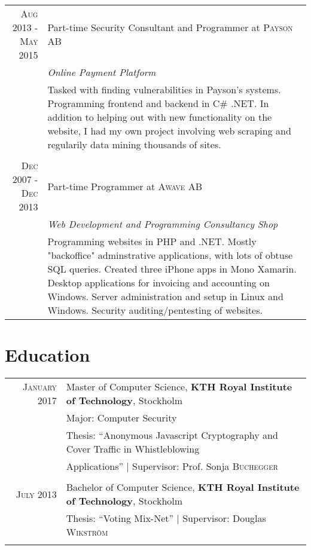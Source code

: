 \documentclass[a4paper,10pt]{article}
\begin{document}
\begin{tabular}{r|p{11cm}}
\textsc{Aug 2013 - May 2015} & Part-time Security Consultant and Programmer at \textsc{Payson AB}\\
&\emph{Online Payment Platform}
\\&\footnotesize{Tasked with finding vulnerabilities in Payson's systems. 
Programming frontend and backend in C\# .NET. In addition to helping out with new 
functionality on the website, I had my own project involving web scraping and 
regularily data mining thousands of sites.}\\\multicolumn{2}{c}{} \\

\textsc{Dec 2007 - Dec 2013} & Part-time Programmer at \textsc{Awave AB}\\
&\emph{Web Development and Programming Consultancy Shop}
\\&\footnotesize{
Programming websites in PHP and .NET. Mostly "backoffice" adminstrative applications, 
with lots of obtuse SQL queries. Created three iPhone apps in Mono Xamarin. 
Desktop applications for invoicing and accounting on Windows. Server administration 
and setup in Linux and Windows. Security auditing/pentesting of websites. }


\end{tabular}

\section{Education}
\begin{tabular}{rl}	
 \textsc{January} 2017 & Master of Computer Science, \textbf{KTH Royal Institute of Technology}, Stockholm\\
&Major: Computer Security\\
& Thesis: ``Anonymous Javascript Cryptography and Cover Traffic in Whistleblowing\\& Applications'' | \small Supervisor: Prof. Sonja \textsc{Buchegger}\\ \\

\textsc{July} 2013 & Bachelor of Computer Science, \textbf{KTH Royal Institute of Technology}, Stockholm\\
& Thesis: ``Voting Mix-Net'' | \small Supervisor: Douglas \textsc{Wikström}\\ \\
\end{tabular}
\end{document}
